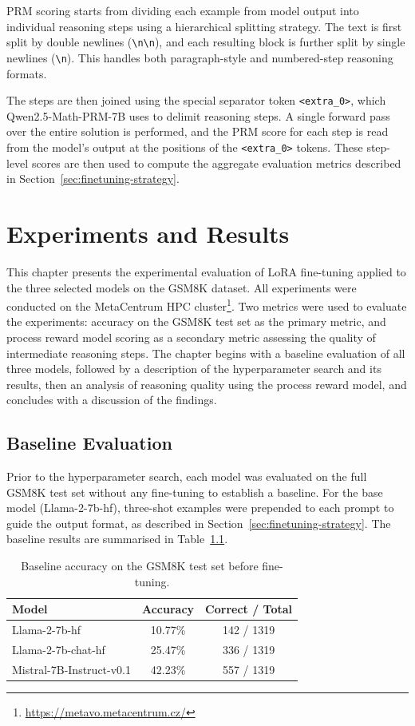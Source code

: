   PRM scoring starts from dividing each example
  from model output into individual reasoning steps using a
  hierarchical splitting strategy. The text is first split by
  double newlines (\texttt{\textbackslash n\textbackslash n}),
  and each resulting block is further split by single
  newlines (\texttt{\textbackslash n}). This handles
  both paragraph-style and numbered-step reasoning
  formats.

  The steps are then joined using the special separator
  token \texttt{<extra\_0>}, which Qwen2.5-Math-PRM-7B
  uses to delimit reasoning steps. A single forward
  pass over the entire solution is performed, and the
  PRM score for each step is read from the model's
  output at the positions of the \texttt{<extra\_0>}
  tokens. These step-level scores are then used to compute
  the aggregate evaluation metrics described in
  Section~\ref{sec:finetuning-strategy}.
\chapter{Experiments and Results}
\label{chap:experiments}
This chapter presents the experimental evaluation
  of LoRA fine-tuning applied to the three selected
  models on the GSM8K dataset. All experiments were
  conducted on the MetaCentrum HPC
  cluster\footnote{\url{https://metavo.metacentrum.cz/}}.
  Two metrics were used to evaluate the
  experiments: accuracy on the GSM8K test set as
  the primary metric, and process reward model
  scoring as a secondary metric assessing the
  quality of intermediate reasoning steps. The
  chapter begins with a baseline evaluation of all three models, followed by a description
  of the
  hyperparameter search and its results, then an analysis of reasoning quality using the
  process reward model, and concludes with a
  discussion of the findings.
\section{Baseline Evaluation}
    Prior to the hyperparameter search, each model was
  evaluated on the full GSM8K test set without any
  fine-tuning to establish a baseline. For the base
  model (Llama-2-7b-hf), three-shot examples were
  prepended to each prompt to guide the output format,
  as described in Section~\ref{sec:finetuning-strategy}.
  The baseline results are summarised in
  Table~\ref{tab:baseline}.

  \begin{table}[ht]
  \caption{Baseline accuracy on the GSM8K test set
  before fine-tuning.}
  \centering
  \begin{tabular}{lcc}
  \toprule
  \textbf{Model} & \textbf{Accuracy} & \textbf{Correct / Total} \\
  \midrule
  Llama-2-7b-hf           & 10.77\% & 142 / 1319 \\
  Llama-2-7b-chat-hf      & 25.47\% & 336 / 1319 \\
  Mistral-7B-Instruct-v0.1 & 42.23\% & 557 / 1319 \\
  \bottomrule
  \end{tabular}

  \label{tab:baseline}
  \end{table}

